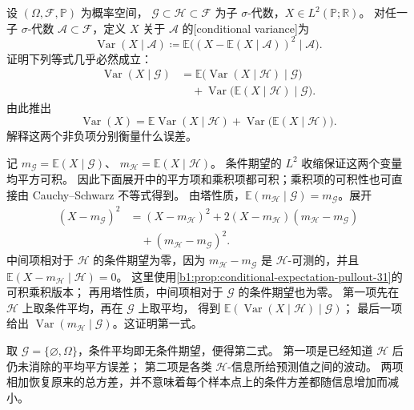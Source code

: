 \begin{exercise}\label{b1:ex:31-total-conditional-variance}
设 \((\Omega,\mathcal F,\mathbb P)\) 为概率空间，
\(\mathcal G\subset\mathcal H\subset\mathcal F\) 为子 \(\sigma\)-代数，\(X\in L^2(\mathbb P;\mathbb R)\)。
对任一子 \(\sigma\)-代数 \(\mathcal A\subset\mathcal F\)，定义
\(X\) 关于 \(\mathcal A\) 的[conditional variance]为
\[
 \operatorname{Var}(X\mid\mathcal A)
 \coloneqq\mathbb E\bigl((X-\mathbb E(X\mid\mathcal A))^2\mid\mathcal A\bigr).
\]
证明下列等式几乎必然成立：
\[
 \begin{aligned}
 \operatorname{Var}(X\mid\mathcal G)
 &=\mathbb E\bigl(\operatorname{Var}(X\mid\mathcal H)\mid\mathcal G\bigr)\\
 &\quad+\operatorname{Var}\bigl(\mathbb E(X\mid\mathcal H)\mid\mathcal G\bigr).
 \end{aligned}
\]
由此推出
\[
 \operatorname{Var}(X)
 =\mathbb E\operatorname{Var}(X\mid\mathcal H)
   +\operatorname{Var}\bigl(\mathbb E(X\mid\mathcal H)\bigr).
\]
解释这两个非负项分别衡量什么误差。
\end{exercise}
\begin{solution}
记 \(m_{\mathcal G}=\mathbb E(X\mid\mathcal G)\)、
\(m_{\mathcal H}=\mathbb E(X\mid\mathcal H)\)。
条件期望的 \(L^2\) 收缩保证这两个变量均平方可积。
因此下面展开中的平方项和乘积项都可积；乘积项的可积性也可直接由 Cauchy--Schwarz 不等式得到。
由塔性质，\(\mathbb E(m_{\mathcal H}\mid\mathcal G)=m_{\mathcal G}\)。展开
\[
 \begin{aligned}
 (X-m_{\mathcal G})^2
 &=(X-m_{\mathcal H})^2
  +2(X-m_{\mathcal H})(m_{\mathcal H}-m_{\mathcal G})\\
 &\quad+(m_{\mathcal H}-m_{\mathcal G})^2.
 \end{aligned}
\]
中间项相对于 \(\mathcal H\) 的条件期望为零，因为
\(m_{\mathcal H}-m_{\mathcal G}\) 是 \(\mathcal H\)-可测的，并且
\(\mathbb E(X-m_{\mathcal H}\mid\mathcal H)=0\)。
这里使用\cref{b1:prop:conditional-expectation-pullout-31}的可积乘积版本；
再用塔性质，中间项相对于 \(\mathcal G\) 的条件期望也为零。
第一项先在 \(\mathcal H\) 上取条件平均，再在 \(\mathcal G\) 上取平均，
得到 \(\mathbb E(\operatorname{Var}(X\mid\mathcal H)\mid\mathcal G)\)；
最后一项给出 \(\operatorname{Var}(m_{\mathcal H}\mid\mathcal G)\)。这证明第一式。

取 \(\mathcal G=\{\varnothing,\Omega\}\)，条件平均即无条件期望，便得第二式。
第一项是已经知道 \(\mathcal H\) 后仍未消除的平均平方误差；
第二项是各类 \(\mathcal H\)-信息所给预测值之间的波动。
两项相加恢复原来的总方差，并不意味着每个样本点上的条件方差都随信息增加而减小。
\end{solution}

